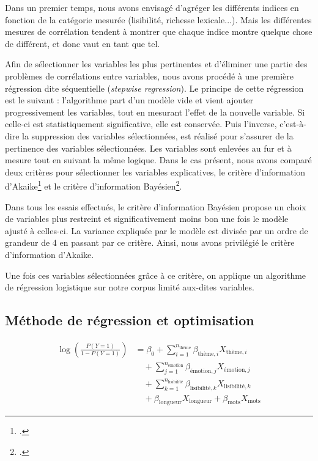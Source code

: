 \documentclass[12pt,a4paper,oneside,titlepage]{book} %
\begin{document}
Dans un premier temps, nous avons envisagé d'agréger les différents indices en fonction de la catégorie mesurée (lisibilité, richesse lexicale...). Mais les différentes mesures de corrélation tendent à montrer que chaque indice montre quelque chose de différent, et donc vaut en tant que tel.


Afin de sélectionner les variables les plus pertinentes et d'éliminer une partie des problèmes de corrélations entre variables, nous avons procédé à une première régression dite séquentielle (\emph{stepwise regression}).  Le principe de cette régression est le suivant : l'algorithme part d'un modèle vide et vient ajouter progressivement les variables, tout en mesurant l'effet de la nouvelle variable. Si celle-ci est statistiquement significative, elle est conservée. Puis l'inverse, c'est-à-dire la suppression des variables sélectionnées, est réalisé pour s'assurer de la pertinence des variables sélectionnées. Les variables sont enlevées au fur et à mesure tout en suivant la même logique. 
Dans le cas présent, nous avons comparé deux critères pour sélectionner les variables explicatives, le critère d'information d'Akaike\footcite{Akaike1998} et le critère d'information Bayésien\footcite{schwarz1978estimating}.

Dans tous les essais effectués, le critère d'information Bayésien propose un choix de variables plus restreint et significativement moins bon une fois le modèle ajusté à celles-ci. La variance expliquée par le modèle est divisée par un ordre de grandeur de 4 en passant par ce critère. Ainsi, nous avons privilégié le critère d'information d'Akaike.

Une fois ces variables sélectionnées grâce à ce critère, on applique un algorithme de régression logistique sur notre corpus limité aux-dites variables. 


\subsection{Méthode de régression et optimisation}


\begin{align*}
\log\left(\frac{P(Y=1)}{1 - P(Y=1)}\right) &= \beta_0 
+ \sum_{i=1}^{n_{\text{thème}}} \beta_{\text{thème},i} X_{\text{thème},i} \\
&\quad + \sum_{j=1}^{n_{\text{émotion}}} \beta_{\text{émotion},j} X_{\text{émotion},j} \\
&\quad + \sum_{k=1}^{n_{\text{lisibilité}}} \beta_{\text{lisibilité},k} X_{\text{lisibilité},k} \\
&\quad + \beta_{\text{longueur}} X_{\text{longueur}} 
+ \beta_{\text{mots}} X_{\text{mots}}
\end{align*}
\end{document}
